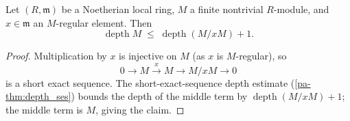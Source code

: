 \begin{lemma}
  \label{pa-lem:depth_quotSMulTop}
  \leanok

  Let \((R, \mathfrak m)\) be a Noetherian local ring, \(M\) a finite nontrivial
  \(R\)-module, and \(x \in \mathfrak m\) an \(M\)-regular element. Then
  \[
    \operatorname{depth} M \;\le\; \operatorname{depth}(M/xM) + 1 .
  \]
\end{lemma}
\begin{proof}
  \leanok
  Multiplication by \(x\) is injective on \(M\) (as \(x\) is \(M\)-regular), so
  \[
    0 \longrightarrow M \xrightarrow{\;x\;} M \longrightarrow M/xM \longrightarrow 0
  \]
  is a short exact sequence. The short-exact-sequence depth estimate
  (\ref{pa-thm:depth_ses}) bounds the depth of the middle term by
  \(\operatorname{depth}(M/xM) + 1\); the middle term is \(M\), giving the claim.
\end{proof}

